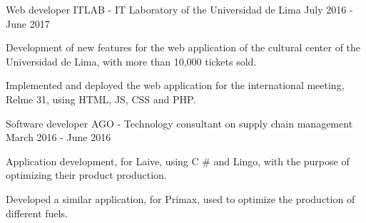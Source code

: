 \begin{cventries}
  \cventry
    {Web developer} %
    {ITLAB {\normalfont - IT Laboratory of the Universidad de Lima}} %
    {} %
    {July 2016 - June 2017} %
    {
      \begin{cvitems} %
        \item {Development of new features for the web application of the cultural center of the Universidad de Lima, with more than 10,000 tickets sold.}
        \item {Implemented and deployed the web application for the international meeting, Relme 31, using HTML, JS, CSS and PHP.}
      \end{cvitems}
    }

  \cventry
    {Software developer} %
    {AGO {\normalfont - Technology consultant on supply chain management}} %
    {} %
    {March 2016 - June 2016} %
    {
      \begin{cvitems} %
        \item {Application development, for Laive, using C \# and Lingo, with the purpose of optimizing their product production.}
        \item {Developed a similar application, for Primax, used to optimize the production of different fuels.}
      \end{cvitems}
    }

\end{cventries}
